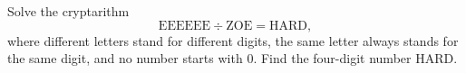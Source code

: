 Solve the cryptarithm
\[
\mathrm{EEEEEE}\div\mathrm{ZOE}=\mathrm{HARD},
\]
where different letters stand for different digits, the same letter always stands for the same digit, and no number starts with $0$. Find the four-digit number $\mathrm{HARD}$.
